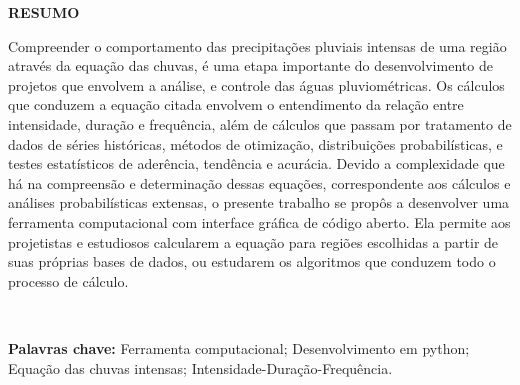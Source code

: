 \thispagestyle{empty}

\singlespacing
\begin{center}
	\textbf{RESUMO}
\end{center}

\noindent Compreender o comportamento das precipitações pluviais intensas de uma região através da equação das chuvas, é uma etapa importante do desenvolvimento de projetos que envolvem a análise, e controle das águas pluviométricas. Os cálculos que conduzem a equação citada envolvem o entendimento da relação entre intensidade, duração e frequência, além de cálculos que passam por tratamento de dados de séries históricas, métodos de otimização, distribuições probabilísticas, e testes estatísticos de aderência, tendência e acurácia. Devido a complexidade que há na compreensão e determinação dessas equações, correspondente aos cálculos e análises probabilísticas extensas, o presente trabalho se propôs a desenvolver uma ferramenta computacional com interface gráfica de código aberto. Ela permite aos projetistas e estudiosos calcularem a equação para regiões escolhidas a partir de suas próprias bases de dados, ou estudarem os algoritmos que conduzem todo o processo de cálculo.

\ \

\noindent \textbf{Palavras chave:} Ferramenta computacional; Desenvolvimento em python; Equação das chuvas intensas; Intensidade-Duração-Frequência.
\newpage
